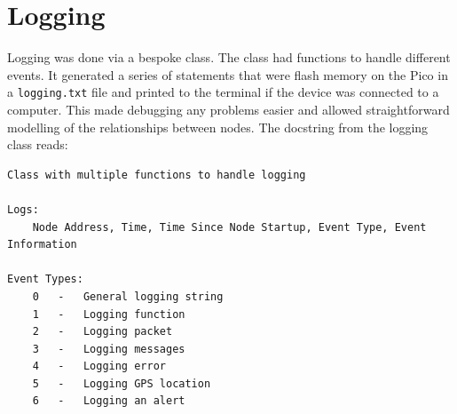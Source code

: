 \documentclass[12pt,a4paper]{report}
\begin{document}
\section{Logging}
Logging was done via a bespoke class. The class had functions to handle different events. It generated a series of statements that were flash memory on the Pico in a \verb'logging.txt' file and printed to the terminal if the device was connected to a computer. This made debugging any problems easier and allowed straightforward modelling of the relationships between nodes. The docstring from the logging class reads:\begin{verbatim}
Class with multiple functions to handle logging
    
Logs: 
    Node Address, Time, Time Since Node Startup, Event Type, Event Information

Event Types:
    0   -   General logging string
    1   -   Logging function
    2   -   Logging packet
    3   -   Logging messages
    4   -   Logging error
    5   -   Logging GPS location
    6   -   Logging an alert
    
\end{verbatim}
\end{document}
